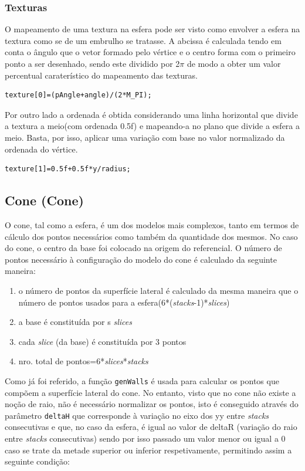 \documentclass{article}
\begin{document}
\subsubsection{Texturas}
O mapeamento de uma textura na esfera pode ser visto como envolver a esfera na textura como se de um embrulho se tratasse.
A abcissa é calculada tendo em conta o ângulo que o vetor formado pelo vértice e o centro forma com o primeiro ponto a ser desenhado, sendo este dividido por 2$\pi$ de modo a obter um valor percentual caraterístico do mapeamento das texturas.
\begin{verbatim}
texture[0]=(pAngle+angle)/(2*M_PI);
\end{verbatim}

Por outro lado a ordenada é obtida considerando uma linha horizontal que divide a textura a meio(com ordenada 0.5f) e mapeando-a no plano que divide a esfera a meio. Basta, por isso, aplicar uma variação com base no valor normalizado da ordenada do vértice.
\begin{verbatim}
texture[1]=0.5f+0.5f*y/radius;
\end{verbatim}

\subsection{Cone (Cone)}
O cone, tal como a esfera, é um dos modelos mais complexos, tanto em termos de cálculo dos pontos necessários como também da quantidade dos mesmos. No caso do cone, o centro da base foi colocado na origem do referencial. O número de pontos necessário à configuração do modelo do cone é calculado da seguinte maneira:
\begin{enumerate}
    \item o número de pontos da superfície lateral é calculado da mesma maneira que o número de pontos usados para a esfera(6*(\textit{stacks}-1)*\textit{slices})
    \item a base é constituída por s \textit{slices}
    \item cada \textit{slice} (da base) é constituída por 3 pontos
    \item nro. total de pontos=6*\textit{slices}*\textit{stacks}
\end{enumerate}

Como já foi referido, a função \texttt{genWalls} é usada para calcular os pontos que compõem a superfície lateral do cone. No entanto, visto que no cone não existe a noção de raio, não é necessário normalizar os pontos, isto é conseguido através do parâmetro \texttt{deltaH} que corresponde à variação no eixo dos yy entre \textit{stacks} consecutivas e que, no caso da esfera, é igual ao valor de deltaR (variação do raio entre \textit{stacks} consecutivas) sendo por isso passado um valor menor ou igual a 0 caso se trate da metade superior ou inferior respetivamente, permitindo assim a seguinte condição:
\end{document}
